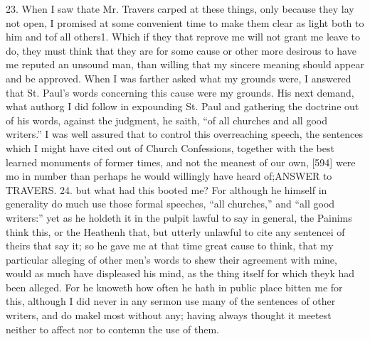 23. When I saw thate Mr. Travers carped at these things, only because they lay not open, I promised at some convenient time to make them clear as light both to him and tof all others1. Which if they that reprove me will not grant me leave to do, they must think that they are for some cause or other more desirous to have me reputed an unsound man, than willing that my sincere meaning should appear and be approved. When I was farther asked what my grounds were, I answered that St. Paul’s words concerning this cause were my grounds. His next demand, what authorg I did follow in expounding St. Paul and gathering the doctrine out of his words, against the judgment, he saith, “of all churches and all good writers.” I was well assured that to control this overreaching speech, the sentences which I might have cited out of Church Confessions, together with the best learned monuments of former times, and not the meanest of our own, [594] were mo in number than perhaps he would willingly have heard of;ANSWER to TRAVERS. 24. but what had this booted me? For although he himself in generality do much use those formal speeches, “all churches,” and “all good writers:” yet as he holdeth it in the pulpit lawful to say in general, the Painims think this, or the Heathenh that, but utterly unlawful to cite any sentencei of theirs that say it; so he gave me at that time great cause to think, that my particular alleging of other men’s words to shew their agreement with mine, would as much have displeased his mind, as the thing itself for which theyk had been alleged. For he knoweth how often he hath in public place bitten me for this, although I did never in any sermon use many of the sentences of other writers, and do makel most without any; having always thought it meetest neither to affect nor to contemn the use of them.

